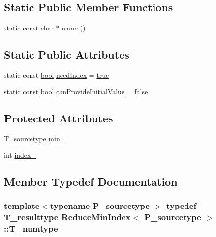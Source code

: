 \subsection*{Static Public Member Functions}
\begin{DoxyCompactItemize}
\item 
static const char $\ast$ \hyperlink{classReduceMinIndex_ac8cc03e197a63e0307d63fe9c78b558f}{name} ()
\end{DoxyCompactItemize}
\subsection*{Static Public Attributes}
\begin{DoxyCompactItemize}
\item 
static const \hyperlink{compiler_8h_abb452686968e48b67397da5f97445f5b}{bool} \hyperlink{classReduceMinIndex_add70aed71f94752c8ab7295a89550c4e}{need\+Index} = \hyperlink{compiler_8h_a41f9c5fb8b08eb5dc3edce4dcb37fee7}{true}
\item 
static const \hyperlink{compiler_8h_abb452686968e48b67397da5f97445f5b}{bool} \hyperlink{classReduceMinIndex_a2ae32e9434b2b1bbc5b8720ca94b54eb}{can\+Provide\+Initial\+Value} = \hyperlink{compiler_8h_a65e9886d74aaee76545e83dd09011727}{false}
\end{DoxyCompactItemize}
\subsection*{Protected Attributes}
\begin{DoxyCompactItemize}
\item 
\hyperlink{classReduceMinIndex_a32f8a59b01d3624a3832598984dc4f2d}{T\+\_\+sourcetype} \hyperlink{classReduceMinIndex_af88672c6246ca52ebcbc09963cdda02c}{min\+\_\+}
\item 
int \hyperlink{classReduceMinIndex_a8ab15dcf04d12322bb9486c236c1bb42}{index\+\_\+}
\end{DoxyCompactItemize}


\subsection{Member Typedef Documentation}
\hypertarget{classReduceMinIndex_aec2f7360d000099b2e6b2893cf4e7430}{}
\subsubsection[{T\+\_\+numtype}]{\setlength{\rightskip}{0pt plus 5cm}template$<$typename P\+\_\+sourcetype $>$ typedef {\bf T\+\_\+resulttype} {\bf Reduce\+Min\+Index}$<$ P\+\_\+sourcetype $>$\+::{\bf T\+\_\+numtype}}\label{classReduceMinIndex_aec2f7360d000099b2e6b2893cf4e7430}
\hypertarget{classReduceMinIndex_abc233796b665428682336475b539b6cf}{}
